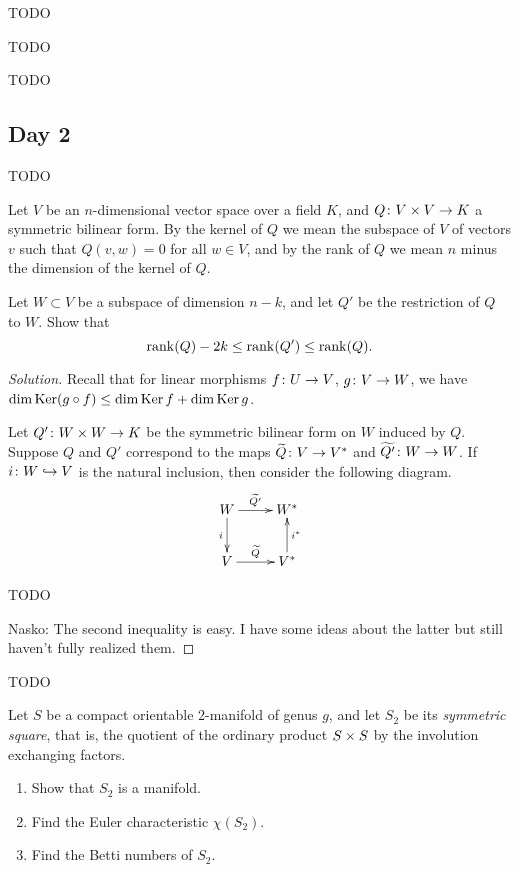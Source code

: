 
TODO


TODO


TODO

\subsection{Day 2}
\label{S:spring-2008-2}
\mbox{}


TODO


Let $V$ be an $n$-dimensional vector space over a field $K$, and $Q \colon V \times V \rightarrow K$ a symmetric bilinear form. By the kernel of $Q$ we mean the subspace of $V$ of vectors $v$ such that $Q(v,w) = 0$ for all $w \in V$, and by the rank of $Q$ we mean $n$ minus the dimension of the kernel of $Q$.

Let $W \subset V$ be a subspace of dimension $n-k$, and let $Q'$ be the restriction of $Q$ to $W$. Show that
\[
\operatorname{rank}(Q) - 2k \leq \operatorname{rank}(Q') \leq \operatorname{rank}(Q).
\]

\begin{proof}[Solution]
  Recall that for linear morphisms $f \colon U \rightarrow V$, $g \colon V \rightarrow W$, we have $\dim\operatorname{Ker}(g \circ f) \leq \dim\operatorname{Ker} f + \dim\operatorname{Ker} g$.

  Let $Q' \colon W \times W \rightarrow K$ be the symmetric bilinear form on $W$ induced by $Q$. Suppose $Q$ and $Q'$ correspond to the maps $\widetilde{Q} \colon V \rightarrow V^\ast$ and $\widetilde{Q'} \colon W \rightarrow W$. If $i \colon W \hookrightarrow V$ is the natural inclusion, then consider the following diagram.
  \[\xymatrix{
    W \ar[r]^-{\wtilde{Q'}} \ar[d]_-{i} & W^\ast \\
    V \ar[r]^-{\wtilde{Q}} & V^\ast \ar[u]_-{i^\ast}
  }\]

  TODO

  Nasko: The second inequality is easy. I have some ideas about the latter but still haven't fully realized them.  
\end{proof}


TODO


Let $S$ be a compact orientable $2$-manifold of genus $g$, and let $S_2$ be its \emph{symmetric square}, that is, the quotient of the ordinary product $S \times S$ by the involution exchanging factors.
\begin{enumerate}
\item Show that $S_2$ is a manifold.
\item Find the Euler characteristic $\chi(S_2)$.
\item Find the Betti numbers of $S_2$.
\end{enumerate}

